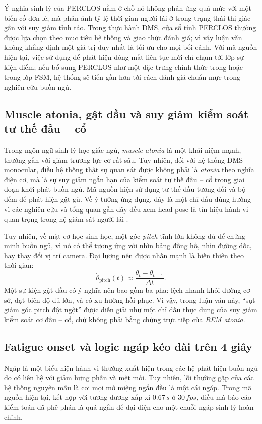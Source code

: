 \documentclass[12pt,a4paper]{article}
\begin{document}
Ý nghĩa sinh lý của PERCLOS nằm ở chỗ nó không phản ứng quá mức với một biến cố đơn lẻ, mà phản ánh tỷ lệ thời gian người lái ở trong trạng thái thị giác gần với suy giảm tỉnh táo. Trong thực hành DMS, cửa sổ tính PERCLOS thường được lựa chọn theo mục tiêu hệ thống và giao thức đánh giá; vì vậy luận văn không khẳng định một giá trị duy nhất là tối ưu cho mọi bối cảnh. Với mã nguồn hiện tại, việc sử dụng  để phát hiện đóng mắt liên tục mới chỉ chạm tới lớp sự kiện điểm; nếu bổ sung PERCLOS như một đặc trưng chính thức trong  hoặc trong lớp FSM, hệ thống sẽ tiến gần hơn tới cách đánh giá chuẩn mực trong nghiên cứu buồn ngủ.

\subsection{Muscle atonia, gật đầu và suy giảm kiểm soát tư thế đầu -- cổ}
Trong ngôn ngữ sinh lý học giấc ngủ, \textit{muscle atonia} là một khái niệm mạnh, thường gắn với giảm trương lực cơ rất sâu. Tuy nhiên, đối với hệ thống DMS monocular, điều hệ thống thật sự quan sát được không phải là \textit{atonia} theo nghĩa điện cơ, mà là sự suy giảm ngắn hạn của kiểm soát tư thế đầu -- cổ trong giai đoạn khởi phát buồn ngủ. Mã nguồn  hiện sử dụng tư thế đầu tương đối  và bộ đếm  để phát hiện gật gù. Về ý tưởng ứng dụng, đây là một chỉ dấu đúng hướng vì các nghiên cứu và tổng quan gần đây đều xem head pose là tín hiệu hành vi quan trọng trong hệ giám sát người lái \cite{review2022,euroncapsd202}.

Tuy nhiên, về mặt cơ học sinh học, một góc \textit{pitch} tĩnh lớn không đủ để chứng minh buồn ngủ, vì nó có thể tương ứng với nhìn bảng đồng hồ, nhìn đường dốc, hay thay đổi vị trí camera. Đại lượng nên được nhấn mạnh là biến thiên theo thời gian:
\[
\dot{\theta}_{\text{pitch}}(t) \approx \frac{\theta_t - \theta_{t-1}}{\Delta t}.
\]
Một sự kiện gật đầu có ý nghĩa nên bao gồm ba pha: lệch nhanh khỏi đường cơ sở, đạt biên độ đủ lớn, và có xu hướng hồi phục. Vì vậy, trong luận văn này, ``sụt giảm góc pitch đột ngột'' được diễn giải như một chỉ dấu thực dụng của suy giảm kiểm soát cơ đầu -- cổ, chứ không phải bằng chứng trực tiếp của \textit{REM atonia}.

\subsection{Fatigue onset và logic ngáp kéo dài trên 4 giây}
Ngáp là một biểu hiện hành vi thường xuất hiện trong các hệ phát hiện buồn ngủ do có liên hệ với giảm hưng phấn và mệt mỏi. Tuy nhiên, lỗi thường gặp của các hệ thống nguyên mẫu là coi mọi mở miệng ngắn đều là một cái ngáp. Trong mã nguồn hiện tại,  kết hợp với  tương đương xấp xỉ \(0.67\,s\) ở \(30\,fps\), điều mà báo cáo kiểm toán đã phê phán là quá ngắn để đại diện cho một chuỗi ngáp sinh lý hoàn chỉnh.
\end{document}

